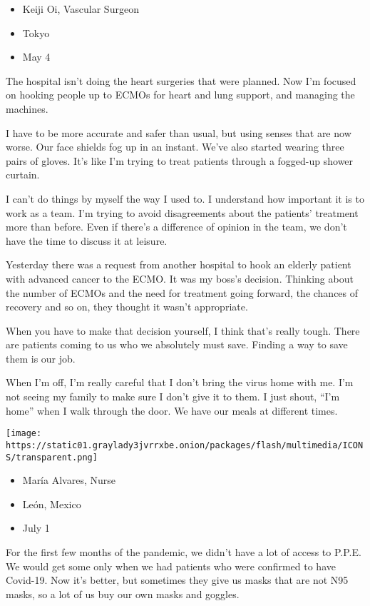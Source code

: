 \begin{itemize}
\tightlist
\item
  Keiji Oi, Vascular Surgeon
\item
  Tokyo
\item
  May 4
\end{itemize}

The hospital isn't doing the heart surgeries that were planned. Now I'm
focused on hooking people up to ECMOs for heart and lung support, and
managing the machines.

I have to be more accurate and safer than usual, but using senses that
are now worse. Our face shields fog up in an instant. We've also started
wearing three pairs of gloves. It's like I'm trying to treat patients
through a fogged-up shower curtain.

I can't do things by myself the way I used to. I understand how
important it is to work as a team. I'm trying to avoid disagreements
about the patients' treatment more than before. Even if there's a
difference of opinion in the team, we don't have the time to discuss it
at leisure.

Yesterday there was a request from another hospital to hook an elderly
patient with advanced cancer to the ECMO. It was my boss's decision.
Thinking about the number of ECMOs and the need for treatment going
forward, the chances of recovery and so on, they thought it wasn't
appropriate.

When you have to make that decision yourself, I think that's really
tough. There are patients coming to us who we absolutely must save.
Finding a way to save them is our job.

When I'm off, I'm really careful that I don't bring the virus home with
me. I'm not seeing my family to make sure I don't give it to them. I
just shout, ``I'm home'' when I walk through the door. We have our meals
at different times.

\texttt{[image: https://static01.graylady3jvrrxbe.onion/packages/flash/multimedia/ICONS/transparent.png]}

\begin{itemize}
\tightlist
\item
  María Alvares, Nurse
\item
  León, Mexico
\item
  July 1
\end{itemize}

For the first few months of the pandemic, we didn't have a lot of access
to P.P.E. We would get some only when we had patients who were confirmed
to have Covid-19. Now it's better, but sometimes they give us masks that
are not N95 masks, so a lot of us buy our own masks and goggles.

